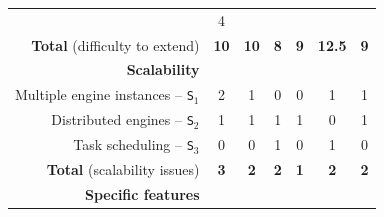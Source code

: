 \documentclass[preprint,3p,twocolumn]{elsarticle}
\begin{document}
\begin{table}
\begin{tabular}{rcccccc}
                                     & \cellcolor[HTML]{99DD99}4\\
  \textbf{Total} (difficulty to extend) & \cellcolor[HTML]{99D299}\textbf{10}
                                     & \cellcolor[HTML]{99D299}\textbf{10}
                                     & \cellcolor[HTML]{99FF99}\textbf{8}
                                     & \cellcolor[HTML]{99E899}\textbf{9}
                                     & \cellcolor[HTML]{999999}\textbf{12.5}
                                     & \cellcolor[HTML]{99E899}\textbf{9}\\
\cellcolor[HTML]{EEEEEE}\textbf{Scalability}& \multicolumn{6}{l}{\cellcolor[HTML]{EEEEEE}}\\
Multiple engine instances -- \texttt{S$_1$}& \cellcolor[HTML]{999999}2
                                     & \cellcolor[HTML]{99CC99}1
                                     & \cellcolor[HTML]{99FF99}0
                                     & \cellcolor[HTML]{99FF99}0
                                     & \cellcolor[HTML]{99CC99}1
                                     & \cellcolor[HTML]{99CC99}1\\
Distributed engines -- \texttt{S$_2$}& \cellcolor[HTML]{999999}1
                                     & \cellcolor[HTML]{999999}1
                                     & \cellcolor[HTML]{999999}1
                                     & \cellcolor[HTML]{999999}1
                                     & \cellcolor[HTML]{99FF99}0
                                     & \cellcolor[HTML]{999999}1\\
Task scheduling -- \texttt{S$_3$}    & \cellcolor[HTML]{99FF99}0
                                     & \cellcolor[HTML]{99FF99}0
                                     & \cellcolor[HTML]{999999}1
                                     & \cellcolor[HTML]{99FF99}0
                                     & \cellcolor[HTML]{999999}1
                                     & \cellcolor[HTML]{99FF99}0\\
\textbf{Total} (scalability issues)  & \cellcolor[HTML]{999999}\textbf{3}
                                     & \cellcolor[HTML]{99CC99}\textbf{2}
                                     & \cellcolor[HTML]{99CC99}\textbf{2}
                                     & \cellcolor[HTML]{99FF99}\textbf{1}
                                     & \cellcolor[HTML]{99CC99}\textbf{2}
                                     & \cellcolor[HTML]{99CC99}\textbf{2}\\
\cellcolor[HTML]{EEEEEE}\textbf{Specific features}& \multicolumn{6}{l}{\cellcolor[HTML]{EEEEEE}}\\

\end{tabular}
\end{table}
\end{document}
